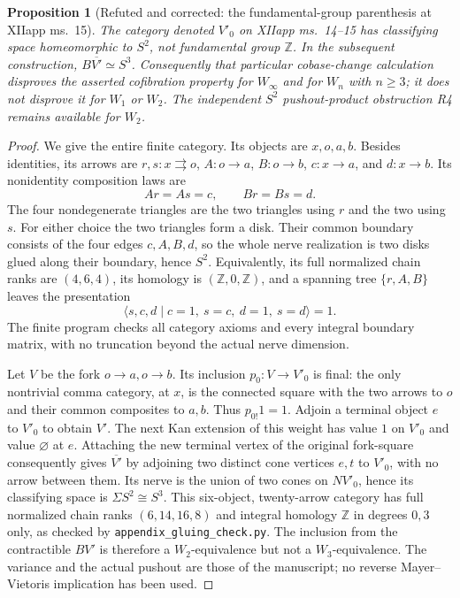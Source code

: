 \documentclass[11pt,a4paper]{article}
\newtheorem{proposition}[theorem]{Proposition}
\theoremstyle{definition}
\theoremstyle{remark}
\newcommand{\Z}{\mathbb Z}
\newcommand{\Winfty}{W_\infty}
\begin{document}
\begin{proposition}[Refuted and corrected: the fundamental-group parenthesis at XIIapp ms.~15]\label{G:appendix-correction}
The category denoted $V'_0$ on XIIapp ms.~14--15 has classifying space homeomorphic to $S^2$, not fundamental group $\Z$. In the subsequent construction, $B\overline{V'}\simeq S^3$. Consequently that particular cobase-change calculation disproves the asserted cofibration property for $\Winfty$ and for $W_n$ with $n\geq3$; it does not disprove it for $W_1$ or $W_2$. The independent $S^2$ pushout-product obstruction R4 remains available for $W_2$.
\end{proposition}
\begin{proof}
We give the entire finite category. Its objects are $x,o,a,b$. Besides identities, its arrows are $r,s:x\rightrightarrows o$, $A:o\to a$, $B:o\to b$, $c:x\to a$, and $d:x\to b$. Its nonidentity composition laws are
\[
 Ar=As=c,\qquad Br=Bs=d.
\]
The four nondegenerate triangles are the two triangles using $r$ and the two using $s$. For either choice the two triangles form a disk. Their common boundary consists of the four edges $c,A,B,d$, so the whole nerve realization is two disks glued along their boundary, hence $S^2$. Equivalently, its full normalized chain ranks are $(4,6,4)$, its homology is $(\Z,0,\Z)$, and a spanning tree $\{r,A,B\}$ leaves the presentation
\[
 \langle s,c,d\mid c=1,\ s=c,\ d=1,\ s=d\rangle=1.
\]
The finite program checks all category axioms and every integral boundary matrix, with no truncation beyond the actual nerve dimension.

Let $V$ be the fork $o\to a,o\to b$. Its inclusion $p_0:V\to V'_0$ is final: the only nontrivial comma category, at $x$, is the connected square with the two arrows to $o$ and their common composites to $a,b$. Thus $p_{0!}1=1$. Adjoin a terminal object $e$ to $V'_0$ to obtain $V'$. The next Kan extension of this weight has value $1$ on $V'_0$ and value $\varnothing$ at $e$. Attaching the new terminal vertex of the original fork-square consequently gives $\overline{V'}$ by adjoining two distinct cone vertices $e,t$ to $V'_0$, with no arrow between them. Its nerve is the union of two cones on $NV'_0$, hence its classifying space is $\Sigma S^2\cong S^3$. This six-object, twenty-arrow category has full normalized chain ranks $(6,14,16,8)$ and integral homology $\Z$ in degrees $0,3$ only, as checked by \texttt{appendix\_gluing\_check.py}. The inclusion from the contractible $BV'$ is therefore a $W_2$-equivalence but not a $W_3$-equivalence. The variance and the actual pushout are those of the manuscript; no reverse Mayer--Vietoris implication has been used.
\end{proof}
\end{document}
